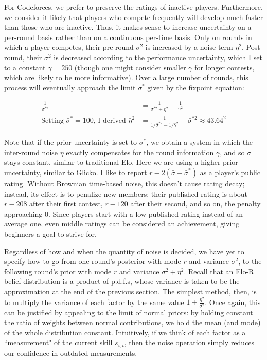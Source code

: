 \documentclass{article}
\begin{document}
For Codeforces, we prefer to preserve the ratings of inactive players. Furthermore, we consider it likely that players who compete frequently will develop much faster than those who are inactive. Thus, it makes sense to increase uncertainty on a per-round basis rather than on a continuous per-time basis. Only on rounds in which a player competes, their pre-round $\sigma^2$ is increased by a noise term $\eta^2$. Post-round, their $\sigma^2$ is decreased according to the performance uncertainty, which I set to a constant $\bar\gamma = 250$ (though one might consider smaller $\gamma$ for longer contests, which are likely to be more informative). Over a large number of rounds, this process will eventually approach the limit $\sigma^*$ given by the fixpoint equation:

\begin{align*}
\frac{1}{\sigma^{*2}} &= \frac{1}{\sigma^{*2} + \eta^2} + \frac{1}{\gamma^2}
\\ \text{Setting }\bar\sigma^*=100\text{, I derived }\bar\eta^2 &= \frac{1}{1/\bar\sigma^{*2} - 1/\bar\gamma^2} - \bar\sigma^{*2} \approx 43.64^2
\end{align*}

Note that if the prior uncertainty is set to $\sigma^*$, we obtain a system in which the inter-round noise $\eta$ exactly compensates for the round information $\gamma$, and so $\sigma$ stays constant, similar to traditional Elo. Here we are using a higher prior uncertainty, similar to Glicko. I like to report $r-2(\bar\sigma-\bar\sigma^*)$ as a player's public rating. Without Brownian time-based noise, this doesn't cause rating decay; instead, its effect is to penalize new members: their published rating is about $r - 208$ after their first contest, $r - 120$ after their second, and so on, the penalty approaching $0$. Since players start with a low published rating instead of an average one, even middle ratings can be considered an achievement, giving beginners a goal to strive for. 

Regardless of how and when the quantity of noise is decided, we have yet to specify how to go from one round's posterior with mode $r$ and variance $\sigma^2$, to the following round's prior with mode $r$ and variance $\sigma^2 + \eta^2$. Recall that an Elo-R belief distribution is a product of p.d.f.s, whose variance is taken to be the approximation at the end of the previous section. The simplest method, then, is to multiply the variance of each factor by the same value $1 + \frac{\eta^2}{\sigma^2}$. Once again, this can be justified by appealing to the limit of normal priors: by holding constant the ratio of weights between normal contributions, we hold the mean (and mode) of the whole distribution constant. Intuitively, if we think of each factor as a ``measurement" of the current skill $s_{i,t}$, then the noise operation simply reduces our confidence in outdated measurements.
\end{document}
